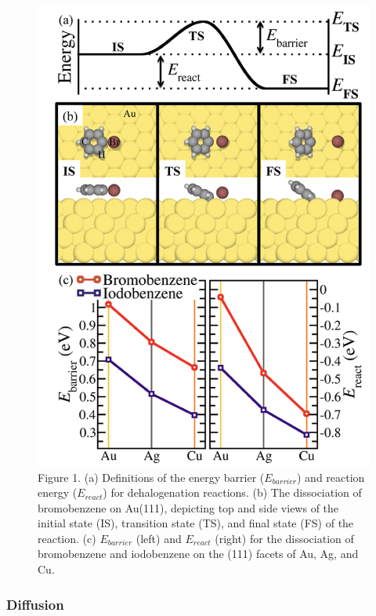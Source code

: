 \documentclass[%
 reprint,
 amsmath,amssymb,
 aps,
prb,
]{revtex4-2}
\begin{document}
\begin{figure}[tbh]
\centering
\includegraphics[width=0.75\columnwidth]{Fig/dehalogentaion.png}
\caption{Figure 1. (a) Definitions of the energy barrier ($E_{barrier}$) and reaction energy ($E_{react}$) for dehalogenation reactions. (b) The dissociation of bromobenzene on Au(111), depicting top and side views of the initial state (IS), transition state (TS), and final state (FS) of the reaction. (c) $E_{barrier}$ (left) and $E_{react}$ (right) for the dissociation of bromobenzene and iodobenzene on the (111) facets of Au, Ag, and Cu.} 
\label{fig:dehalo}
\end{figure}

\subsubsection{Diffusion}
\end{document}

